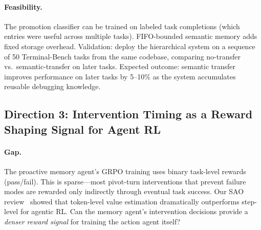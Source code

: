 \documentclass[11pt,a4paper]{article}
\begin{document}
\paragraph{Feasibility.} The promotion classifier can be trained on labeled task completions (which entries were useful across multiple tasks). FIFO-bounded semantic memory adds fixed storage overhead. Validation: deploy the hierarchical system on a sequence of 50 Terminal-Bench tasks from the same codebase, comparing no-transfer vs.\ semantic-transfer on later tasks. Expected outcome: semantic transfer improves performance on later tasks by 5--10\% as the system accumulates reusable debugging knowledge.

\subsection{Direction 3: Intervention Timing as a Reward Shaping Signal for Agent RL}

\paragraph{Gap.} The proactive memory agent's GRPO training uses binary task-level rewards (pass/fail). This is sparse---most pivot-turn interventions that prevent failure modes are rewarded only indirectly through eventual task success. Our SAO review~\cite{sao2026} showed that token-level value estimation dramatically outperforms step-level for agentic RL. Can the memory agent's intervention decisions provide a \emph{denser reward signal} for training the action agent itself?
\end{document}
